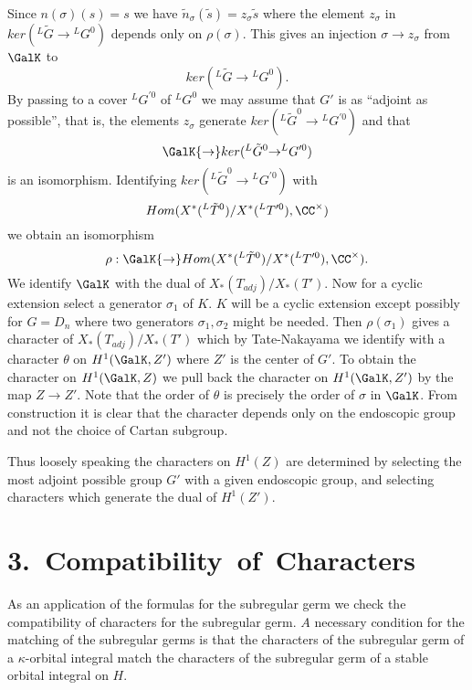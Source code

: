 \documentclass{memo-l}
\theoremstyle{definition}
\theoremstyle{remark}
\numberwithin{section}{chapter}
\numberwithin{equation}{chapter}
\begin{document}
   Since $n({\sigma})(s) = s$ we have $\tilde n _{{\sigma}}(\tilde s) 
= z_{{\sigma}}\tilde s $ where the element $z_{{\sigma}}$ in
$ker({}^{L}\tilde G {\to} {}^{L}G^{0})$ depends only on ${\rho }({\sigma})$.
This gives an injection ${\sigma} {\to} z_{{\sigma}}$ from $\GalK$ to
$$ker({}^{L}\tilde G {\to} {}^{L}G^{0}).$$  By passing to a cover ${}^{L}G^{\prime0}$ of
${}^{L}G^{0}$ we may assume that $G'$ is as ``adjoint as possible'', that is,
the elements $z_{{\sigma}}$ generate $ker({}^{L}\tilde G^{0} \to
{}^{L}G^{\prime0})$ and that $$\GalK {\to} ker({}^{L}\tilde G ^{0} {\to}
{}^{L}G^{\prime0})$$ is an isomorphism.  Identifying $ker({}^{L} \tilde G ^{0} {\to}
{}^{L}G^{\prime0})$ with $$Hom(X^{*}({}^{L}\tilde T ^{0})/X^{*}({}^{L}T^{\prime0}),
{\CC}^{\times})$$ we obtain an isomorphism 
$${\rho }:\GalK {\to}
Hom(X^{*}({}^{L}\tilde T ^{0})/X^{*}({}^{L}T^{\prime0}),
{\CC}^{\times}).$$  We
identify $\GalK$ with the dual of $X_{*}(T_{adj})/X_{*}(T')$.  Now for a cyclic
extension
select a generator ${\sigma}_{1}$ of $K$.  $K$ will be a cyclic extension
except possibly for $G = D_{n}$ where two generators
${\sigma}_{1},{\sigma}_{2}$ might be needed.  Then ${\rho }({\sigma}_{1})$
gives a character of $X_{*}(T_{adj})/X_{*}(T')$ which by Tate-Nakayama we
identify with a character ${\theta}$ on $H^{1}(\GalK,Z')$ where $Z'$ is
the center of $G'$.  To obtain the character on $H^{1}(\GalK,Z)$ we pull
back the character on $H^{1}(\GalK,Z')$ by the map $Z {\to} Z'$.  Note
that the order of ${\theta}$ is precisely the order of ${\sigma}$ in
$\GalK$.  From construction it is clear that the character depends only
on the endoscopic group and not the choice of Cartan subgroup.

   Thus loosely speaking the characters on $H^{1}(Z)$ are determined by
selecting the most adjoint possible group $G'$ with a given endoscopic
group, and selecting characters which generate the dual of $H^{1}(Z')$.




\section{3.\  Compatibility\ of\ Characters}

   As an application of the formulas for the subregular germ we check the
compatibility of characters for the subregular germ.  $A$ necessary
condition for the matching of the subregular germs is that the characters
of the subregular germ of a ${\kappa}$-orbital integral match the
characters of the subregular germ of a stable orbital integral on $H$.
\end{document}
